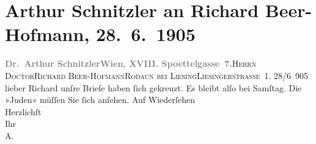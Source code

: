 

         
         \renewcommand{\erwaehntePersonen}{Personen: Richard Beer-Hofmann}
         \renewcommand{\erwaehnteOrte}{Orte: Edmund-Weiß-Gasse, IX., Alsergrund, Liesingerstraße, Rodaun, Wien}
         \renewcommand{\erwaehnteWerke}{Werke: Die Juden. Schauspiel in drei Aufzügen}
               \section[Arthur Schnitzler an Richard Beer-Hofmann, 28. 6. 1905]{ Arthur Schnitzler an Richard Beer-Hofmann, 28. 6. 1905}\nopagebreak{}\rehead{ }\begin{ledgroupsized}[t]{13cm}\normalsize\beginnumbering \toendnotes[C]{\smallbreak\pagebreak[2]} 
\pstart{}{\pb}\textcolor{gray}{\textbf{Dr. Arthur Schnitzler}}\pend{}\pstart{}\textcolor{gray}{\textbf{Wien, XVIII. Spoettelgasse 7.}}\pend{}{\bigskip}\pstart{}{\pb}\textsc{Herrn Doctor}\pend{}\pstart{}\textsc{Richard Beer-Hofmann}\pend{}\pstart{}\textsc{Rodaun bei Liesing}\pend{}\pstart{}\textsc{Liesingerstraße 1}.\pend{}{\bigskip}\pstart
           \raggedleft{}{\pb}28/6 905\pend
           \pstart{}lieber Richard\pend\pstart
           unſre Briefe haben ſich gekreuzt. Es bleibt alſo bei Samſtag.\pend
           \pstart
           Die »Juden« müſſen Sie ſich anſehen.\pend
           \pstart
           {\pb}Auf Wiederſehen{\\}Herzlichſt{\\}Ihr{\\}\spacefill\mbox{A.}\pend
           
         
         \endnumbering{}\end{ledgroupsized}  \newcommand{\dateiname}{L01529}\newcommand{\titel}{Arthur Schnitzler an Richard Beer-Hofmann, 28. 6. 1905}\newcommand{\editorInnen}{Martin Anton Müller und Gerd-Hermann Susen}
      